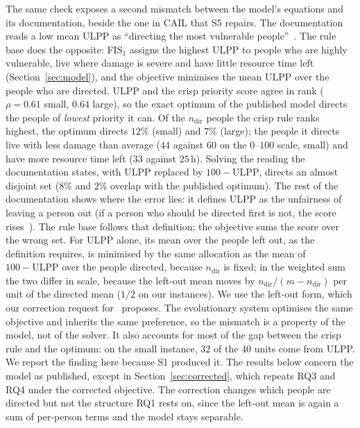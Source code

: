 \documentclass[systems,article,accept,moreauthors,pdftex]{Definitions/mdpi}
\begin{document}
The same check exposes a second mismatch between the model's equations and its
documentation, beside the one in CAIL that S5 repairs. The documentation reads a low mean ULPP
as ``directing the most vulnerable people''~\cite{rabiei2026resilient}. The rule base does the
opposite: FIS$_1$ assigns the highest ULPP to people who are highly vulnerable, live where
damage is severe and have little resource time left (Section~\ref{sec:model}), and the
objective minimises the mean ULPP over the people who are directed. ULPP and the crisp
priority score agree in rank ($\rho = 0.61$ small, $0.64$ large), so the exact optimum of the
published model directs the people of \emph{lowest} priority it can. Of the $n_{\mathrm{dir}}$
people the crisp rule ranks highest, the optimum directs $12\%$ (small) and $7\%$ (large); the
people it directs live with less damage than average ($44$ against $60$ on the $0$--$100$ scale,
small) and have more resource time left ($33$ against $25$\,h). Solving the reading the
documentation states, with ULPP replaced by $100 - \mathrm{ULPP}$, directs an almost disjoint
set ($8\%$ and $2\%$ overlap with the published optimum). The rest of the documentation shows
where the error lies: it defines ULPP as the unfairness of leaving a person out (if a person
who should be directed first is not, the score rises~\cite{rabiei2026resilient}). The rule base
follows that definition; the objective sums the score over the wrong set. For ULPP alone, its
mean over the people left out, as the definition requires, is minimised by the same allocation as
the mean of $100 - \mathrm{ULPP}$ over the people directed, because $n_{\mathrm{dir}}$ is fixed; in
the weighted sum the two differ in scale, because the left-out mean moves by
$n_{\mathrm{dir}}/(m - n_{\mathrm{dir}})$ per unit of the directed mean ($1/2$ on our instances).
We use the left-out form, which our correction request for~\cite{rabiei2026resilient} proposes. The evolutionary system optimises the
same objective and inherits the same preference, so the mismatch is a property of the model,
not of the solver. It also accounts for most of the gap between the crisp rule and the
optimum: on the small instance, $32$ of the $40$ units come from ULPP. We report the finding
here because S1 produced it. The results below concern the model as published, except in
Section~\ref{sec:corrected}, which repeats RQ3 and RQ4 under the corrected objective. The
correction changes which people are directed but not the structure RQ1 rests on, since the
left-out mean is again a sum of per-person terms and the model stays separable.
\end{document}
